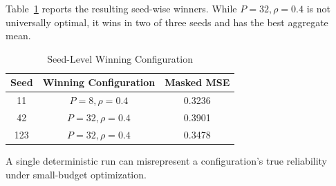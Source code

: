 \documentclass[journal]{IEEEtran}
\begin{document}
Table~\ref{tab:seed_winners} reports the resulting seed-wise winners. While $P=32,\rho=0.4$ is not universally optimal, it wins in two of three seeds and has the best aggregate mean.

\begin{table}[!t]
\caption{Seed-Level Winning Configuration}
\label{tab:seed_winners}
\centering
\begin{tabular}{ccc}
\toprule
Seed & Winning Configuration & Masked MSE \\
\midrule
11  & $P=8,\rho=0.4$  & 0.3236 \\
42  & $P=32,\rho=0.4$ & 0.3901 \\
123 & $P=32,\rho=0.4$ & 0.3478 \\
\bottomrule
\end{tabular}
\end{table}

A single deterministic run can misrepresent a configuration's true reliability under small-budget optimization.
\end{document}
